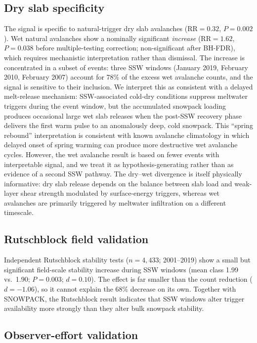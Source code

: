 \documentclass[11pt,letterpaper]{article}
\begin{document}
\subsection*{Dry slab specificity}

The signal is specific to natural-trigger dry slab avalanches ($\mathrm{RR} = 0.32$, $P = 0.002$). Wet natural avalanches show a nominally significant \emph{increase} ($\mathrm{RR} = 1.62$, $P = 0.038$ before multiple-testing correction; non-significant after BH-FDR), which requires mechanistic interpretation rather than dismissal. The increase is concentrated in a subset of events: three SSW windows (January 2019, February 2010, February 2007) account for 78\% of the excess wet avalanche counts, and the signal is sensitive to their inclusion. We interpret this as consistent with a delayed melt-release mechanism: SSW-associated cold-dry conditions suppress meltwater triggers during the event window, but the accumulated snowpack loading produces occasional large wet slab releases when the post-SSW recovery phase delivers the first warm pulse to an anomalously deep, cold snowpack. This ``spring rebound'' interpretation is consistent with known avalanche climatology in which delayed onset of spring warming can produce more destructive wet avalanche cycles\cite{Schweizer2003}. However, the wet avalanche result is based on fewer events with interpretable signal, and we treat it as hypothesis-generating rather than as evidence of a second SSW pathway. The dry--wet divergence is itself physically informative: dry slab release depends on the balance between slab load and weak-layer shear strength modulated by surface-energy triggers, whereas wet avalanches are primarily triggered by meltwater infiltration on a different timescale.

\subsection*{Rutschblock field validation}

Independent Rutschblock stability tests ($n = 4{,}433$; 2001--2019) show a small but significant field-scale stability increase during SSW windows (mean class 1.99 vs.\ 1.90; $P = 0.003$; $d = 0.10$). The effect is far smaller than the count reduction ($d = -1.06$), so it cannot explain the 68\% decrease on its own. Together with SNOWPACK, the Rutschblock result indicates that SSW windows alter trigger availability more strongly than they alter bulk snowpack stability.

\subsection*{Observer-effort validation}
\end{document}
